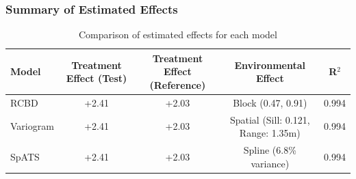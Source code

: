 \begin{frame}
    \frametitle{Summary of Estimated Effects}
    \begin{table}[h]
        \centering
        \scriptsize
        \begin{tabular}{|l|c|c|c|c|}
            \hline
            \rowcolor{lightblue}
            \textbf{Model} & \textbf{Treatment Effect (Test)} & \textbf{Treatment Effect (Reference)} & \textbf{Environmental Effect} & \textbf{R$^2$} \\
            \hline
            \rowcolor{lightgray}
            RCBD & +2.41 & +2.03 & Block (0.47, 0.91) & 0.994 \\
            \hline
            Variogram & +2.41 & +2.03 & Spatial (Sill: 0.121, Range: 1.35m) & 0.994 \\
            \hline
            \rowcolor{lightgray}
            SpATS & +2.41 & +2.03 & Spline (6.8\% variance) & 0.994 \\
            \hline
        \end{tabular}
        \caption{Comparison of estimated effects for each model}
    \end{table}
\end{frame}


